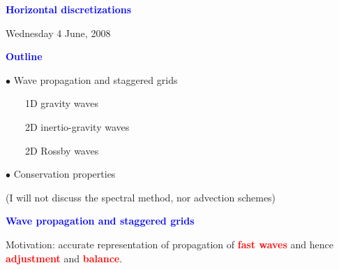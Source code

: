\documentclass[a4]{seminar}
\newcommand{\R}[1]{\textcolor{red}{#1}}
\newcommand{\B}[1]{\textcolor{blue}{#1}}
\begin{document}

\pagestyle{fancy}



\begin{slide}

\begin{center}

{\Large \bf
\B{Horizontal discretizations}
}

\end{center}

\vspace{6mm}

\begin{center}
{\small Wednesday 4 June, 2008}
\end{center}

\end{slide}


\begin{slide}

\B{\bf Outline}

\vspace{4mm}

\(\bullet\) Wave propagation and staggered grids

\ \ \ \ 1D gravity waves

\ \ \ \ 2D inertio-gravity waves

\ \ \ \ 2D Rossby waves

\vspace{4mm}

\(\bullet\) Conservation properties


\vspace{6mm}
(I will not discuss the spectral method, nor advection schemes)


\end{slide}


\begin{slide}

\B{\bf Wave propagation and staggered grids}

\vspace{3mm}

Motivation: accurate representation of propagation of \R{\bf fast waves} and
hence \R{\bf adjustment} and \R{\bf balance}.

\end{slide}
\end{document}
